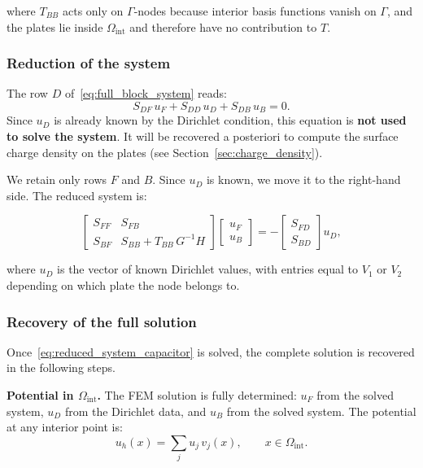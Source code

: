 \documentclass[11pt,onecolumn]{article}
\begin{document}
where $T_{BB}$ acts only on $\Gamma$-nodes because interior basis functions vanish on $\Gamma$, 
and the plates lie inside $\Omega_{\text{int}}$ and therefore have no contribution to $T$. 

\subsubsection{Reduction of the system}

The row $D$ of~\eqref{eq:full_block_system} reads:
\begin{equation}
S_{DF}\, u_F + S_{DD}\, u_D + S_{DB}\, u_B = 0.
\label{eq:row_D}
\end{equation}
Since $u_D$ is already known by the Dirichlet condition, this equation is \textbf{not used to 
solve the system}. It will be recovered a posteriori to compute the surface charge density on 
the plates (see Section~\ref{sec:charge_density}).

We retain only rows $F$ and $B$. Since $u_D$ is known, we move it to the right-hand side. 
The reduced system is:

\begin{equation}
\begin{bmatrix}
S_{FF} & S_{FB} \\
S_{BF} & S_{BB} + T_{BB}\,G^{-1}H
\end{bmatrix}
\begin{bmatrix}
u_F \\ u_B
\end{bmatrix}
=
-\begin{bmatrix}
S_{FD} \\ S_{BD}
\end{bmatrix}
u_D,
\label{eq:reduced_system_capacitor}
\end{equation}

where $u_D$ is the vector of known Dirichlet values, with entries equal to $V_1$ or $V_2$ 
depending on which plate the node belongs to.

\subsubsection{Recovery of the full solution}\label{subsec:recovery_solution}

Once~\eqref{eq:reduced_system_capacitor} is solved, the complete solution is recovered in the 
following steps.

\textbf{Potential in $\Omega_{\text{int}}$.}
The FEM solution is fully determined: $u_F$ from the solved system, $u_D$ from the Dirichlet 
data, and $u_B$ from the solved system. The potential at any interior point is:
\begin{equation}
u_h(x) = \sum_j u_j\, v_j(x), \qquad x \in \Omega_{\text{int}}.
\end{equation}
\end{document}
